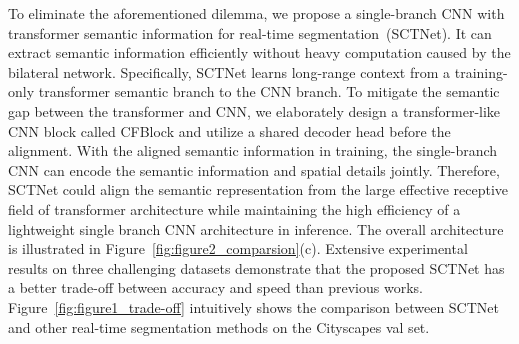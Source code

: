 \documentclass[letterpaper]{article} %
\begin{document}
To eliminate the aforementioned dilemma, we propose a single-branch CNN with transformer semantic information for real-time segmentation~(SCTNet). It can extract semantic information efficiently without heavy computation caused by the bilateral network. Specifically, SCTNet learns long-range context from a training-only transformer semantic branch to the CNN branch. To mitigate the semantic gap between the transformer and CNN, we elaborately design a transformer-like CNN block called CFBlock and utilize a shared decoder head before the alignment. With the aligned semantic information in training, the single-branch CNN can encode the semantic information and spatial details jointly. Therefore, SCTNet could align the semantic representation from the large effective receptive field of transformer architecture while maintaining the high efficiency of a lightweight single branch CNN architecture in inference. The overall architecture is illustrated in Figure~\ref{fig:figure2_comparsion}(c). Extensive experimental results on three challenging datasets demonstrate that the proposed SCTNet has a better trade-off between accuracy and speed than previous works.
Figure~\ref{fig:figure1_trade-off} intuitively shows the comparison between SCTNet and other real-time segmentation methods on the Cityscapes val set.
\end{document}
